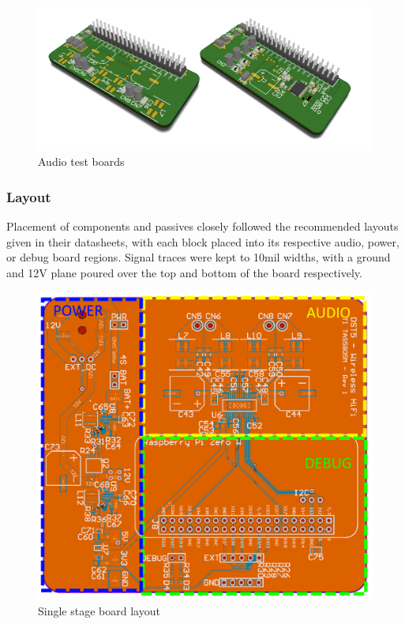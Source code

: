 \documentclass[main.tex]{subfiles}
\begin{document}
\begin{figure}[H]
    \centering
    \includegraphics[scale=0.2]{./figs/test-boards.png}
    \caption{Audio test boards}
    \label{fig:ti-pcb}
\end{figure}

\subsubsection{Layout}

Placement of components and passives closely followed the recommended layouts given in their datasheets, with each block placed into its respective audio, power, or debug board regions. Signal traces were kept to 10mil widths, with a ground and 12V plane poured over the top and bottom of the board respectively. 

\begin{figure}[H]
    \centering
    \includegraphics[scale=0.4]{./figs/ti-pcb.png}
    \caption{Single stage board layout}
    \label{fig:ti-pcb}
\end{figure}
\end{document}
